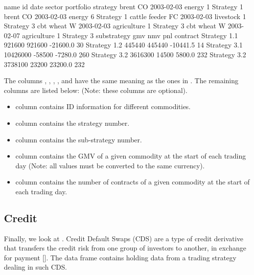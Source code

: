 \documentclass[article]{jss}
\begin{document}
\begin{Schunk}
\begin{Soutput}
          name id       date      sector portfolio   strategy
         brent CO 2003-02-03      energy         1 Strategy 1
         brent CO 2003-02-03      energy         6 Strategy 1
 cattle feeder FC 2003-02-03   livestock         1 Strategy 3
     cbt wheat  W 2003-02-03 agriculture         1 Strategy 3
     cbt wheat  W 2003-02-07 agriculture         1 Strategy 3
  substrategy      gmv    nmv      pnl contract
 Strategy 1.1   921600 921600 -21600.0       30
 Strategy 1.2   445440 445440 -10441.5       14
 Strategy 3.1 10426000 -58500  -7280.0      260
 Strategy 3.2  3616300  14500   5800.0      232
 Strategy 3.2  3738100  23200  23200.0      232
\end{Soutput}
\end{Schunk}

The columns , , , , and  have the same meaning as the ones in . The remaining columns are listed below: (Note: these columns are optional). 

\begin{itemize}
\item{ column contains ID information for different commodities. }
\item{ column contains the strategy number.
}
\item{ column contains the sub-strategy number.
}
\item{ column contains the GMV of a given commodity at the start of each trading day  (Note: all values must be converted to the same currency). 
}

\item{ column contains the number of contracts of a given commodity at the start of each trading day.  
}
\end{itemize}

\subsection{Credit}

Finally, we look at . Credit Default Swaps (CDS) are a type of credit derivative that transfers the credit risk from one group of investors to another, in exchange for payment [\cite{CDS}]. The  data frame contains holding data from a trading strategy dealing in such CDS. 
\end{document}
